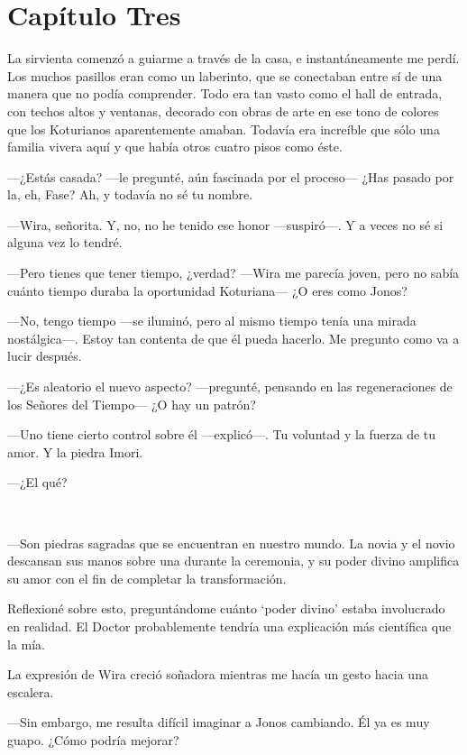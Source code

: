 \chapter*{Capítulo Tres}

La sirvienta comenzó a guiarme a través de la casa, e instantáneamente
me perdí. Los muchos pasillos eran como un laberinto, que se conectaban
entre sí de una manera que no podía comprender. Todo era tan vasto como
el hall de entrada, con techos altos y ventanas, decorado con obras de
arte en ese tono de colores que los Koturianos aparentemente amaban.
Todavía era increíble que sólo una familia vivera aquí y que había otros
cuatro pisos como éste.

---¿Estás casada? ---le pregunté, aún fascinada por el proceso--- ¿Has
pasado por la, eh, Fase? Ah, y todavía no sé tu nombre.

---Wira, señorita. Y, no, no he tenido ese honor ---suspiró---. Y a
veces no sé si alguna vez lo tendré.

---Pero tienes que tener tiempo, ¿verdad? ---Wira me parecía joven, pero
no sabía cuánto tiempo duraba la oportunidad Koturiana--- ¿O eres como
Jonos?

---No, tengo tiempo ---se iluminó, pero al mismo tiempo tenía una mirada
nostálgica---. Estoy tan contenta de que él pueda hacerlo. Me pregunto
como va a lucir después.

---¿Es aleatorio el nuevo aspecto? ---pregunté, pensando en las
regeneraciones de los Señores del Tiempo--- ¿O hay un patrón?

---Uno tiene cierto control sobre él ---explicó---. Tu voluntad y la
fuerza de tu amor. Y la piedra Imori.

---¿El qué?

~

---Son piedras sagradas que se encuentran en nuestro mundo. La novia y
el novio descansan sus manos sobre una durante la ceremonia, y su poder
divino amplifica su amor con el fin de completar la transformación.

Reflexioné sobre esto, preguntándome cuánto `poder divino' estaba
involucrado en realidad. El Doctor probablemente tendría una explicación
más científica que la mía.

La expresión de Wira creció soñadora mientras me hacía un gesto hacia
una escalera.

---Sin embargo, me resulta difícil imaginar a Jonos cambiando. Él ya es
muy guapo. ¿Cómo podría mejorar?

